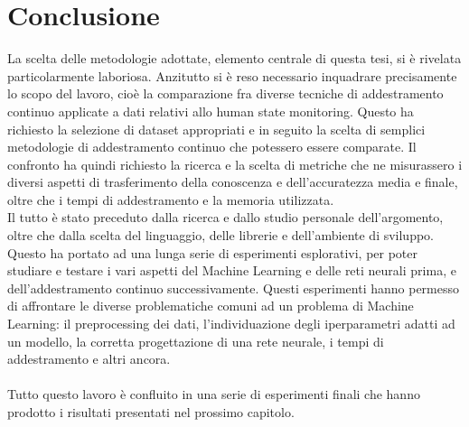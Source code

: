 \section{Conclusione}
La scelta delle metodologie adottate, elemento centrale di questa tesi, si è rivelata particolarmente laboriosa. Anzitutto si è reso necessario inquadrare precisamente lo scopo del lavoro, cioè la comparazione fra diverse tecniche di addestramento continuo applicate a dati relativi allo human state monitoring. Questo ha richiesto la selezione di dataset appropriati e in seguito la scelta di semplici metodologie di addestramento continuo che potessero essere comparate. Il confronto ha quindi richiesto la ricerca e la scelta di metriche che ne misurassero i diversi aspetti di trasferimento della conoscenza e dell'accuratezza media e finale, oltre che i tempi di addestramento e la memoria utilizzata.\\
Il tutto è stato preceduto dalla ricerca e dallo studio personale dell'argomento, oltre che dalla scelta del linguaggio, delle librerie e dell'ambiente di sviluppo. Questo ha portato ad una lunga serie di esperimenti esplorativi, per poter studiare e testare i vari aspetti del Machine Learning e delle reti neurali prima, e dell'addestramento continuo successivamente. Questi esperimenti hanno permesso di affrontare le diverse problematiche comuni ad un problema di Machine Learning: il preprocessing dei dati, l'individuazione degli iperparametri adatti ad un modello, la corretta progettazione di una rete neurale, i tempi di addestramento e altri ancora.\\\\
Tutto questo lavoro è confluito in una serie di esperimenti finali che hanno prodotto i risultati presentati nel prossimo capitolo.


